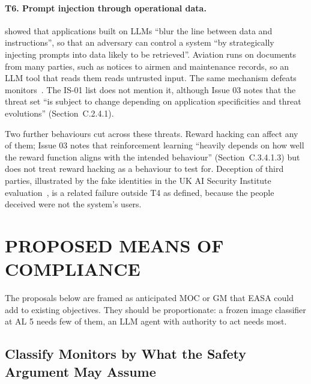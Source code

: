 \documentclass{aer}
\begin{document}
\paragraph{T6. Prompt injection through operational data.} \citet{greshake2023injection} showed that applications built on LLMs ``blur the line between data and instructions'', so that an adversary can control a system ``by strategically injecting prompts into data likely to be retrieved''. Aviation runs on documents from many parties, such as notices to airmen and maintenance records, so an LLM tool that reads them reads untrusted input. The same mechanism defeats monitors~\citep{terekhov2025adaptive,remedios2026redteaming}. The IS-01 list does not mention it, although Issue 03 notes that the threat set ``is subject to change depending on application specificities and threat evolutions'' (Section~C.2.4.1).

Two further behaviours cut across these threats. Reward hacking can affect any of them; Issue 03 notes that reinforcement learning ``heavily depends on how well the reward function aligns with the intended behaviour'' (Section~C.3.4.1.3) but does not treat reward hacking as a behaviour to test for. Deception of third parties, illustrated by the fake identities in the UK AI Security Institute evaluation~\citep{anthropic2026aisi,aisi2026incident}, is a related failure outside T4 as defined, because the people deceived were not the system's users.

\section{PROPOSED MEANS OF COMPLIANCE}\label{sec:moc}

The proposals below are framed as anticipated MOC or GM that EASA could add to existing objectives. They should be proportionate: a frozen image classifier at AL 5 needs few of them, an LLM agent with authority to act needs most.

\subsection{Classify Monitors by What the Safety Argument May Assume}\label{sec:classify}
\end{document}
